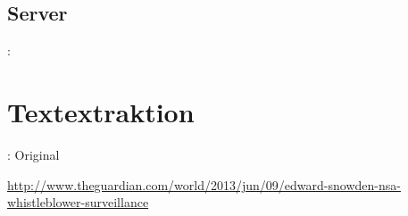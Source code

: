 \documentclass[12pt, utf8, ngerman]{beamer}
\begin{document}
\subsection{Server}
\begin{frame}{\insertsection: \insertsubsection}
\end{frame}


\section{Textextraktion}

\begin{frame}{\insertsection: Original}

    \scriptsize
    \vspace{.1cm}
    \url{http://www.theguardian.com/world/2013/jun/09/edward-snowden-nsa-whistleblower-surveillance}
\end{frame}
\end{document}
